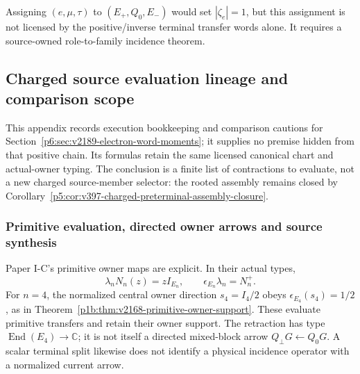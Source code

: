 \documentclass[12pt,a4paper]{article}
\begin{document}
\begin{remark}
\label{p6:rem:v595-structural-flag-firewall}
Assigning $(e,\mu,\tau)$ to $(E_+,Q_0,E_-)$ would set $|\zeta_e|=1$, but this
assignment is not licensed by the positive/inverse terminal transfer words
alone.  It requires a source-owned role-to-family incidence theorem.
\end{remark}



\subsection{Charged source evaluation lineage and comparison scope}
\label{p6:app:v2189-electron-execution-lineage}

This appendix records execution bookkeeping and comparison cautions for
Section~\ref{p6:sec:v2189-electron-word-moments}; it supplies no premise
hidden from that positive chain. Its formulas retain the same licensed
canonical chart and actual-owner typing. The conclusion is a finite list
of contractions to evaluate, not a new charged source-member selector:
the rooted assembly remains closed by
Corollary~\ref{p5:cor:v397-charged-preterminal-assembly-closure}.

\subsubsection{Primitive evaluation, directed owner arrows and source synthesis}
\label{p6:app:v2189-directed-arrow-lineage}
Paper I-C's primitive owner maps are explicit. In their actual types,
\[
 \lambda_nN_n(z)=zI_{E_n},\qquad
 \epsilon_{E_n}\lambda_n=N_n^+.
\]
For $n=4$, the normalized central owner direction $s_4=I_4/2$ obeys
$\epsilon_{E_4}(s_4)=1/2$, as in
Theorem~\ref{p1b:thm:v2168-primitive-owner-support}.
These evaluate primitive transfers and retain their owner support.
The retraction has type $\operatorname{End}(E_4)\to\mathbb C$; it is
not itself a directed mixed-block arrow $Q_\perp G\leftarrow Q_0G$.
A scalar terminal split likewise does not identify a physical incidence
operator with a normalized current arrow.
\end{document}
